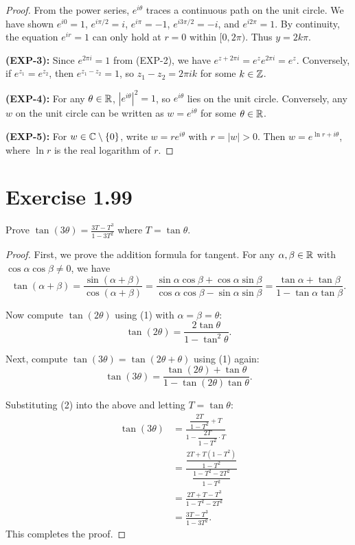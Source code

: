 \documentclass{article}
\begin{document}
\begin{proof}
  From the power series, $e^{i\theta}$ traces a continuous path on the
  unit circle. We have shown $e^{i0} = 1$, $e^{i\pi/2} = i$, $e^{i\pi} = -1$,
  $e^{i3\pi/2} = -i$, and $e^{i2\pi} = 1$. By continuity, the equation
  $e^{ir} = 1$ can only hold at $r = 0$ within $[0, 2\pi)$. Thus $y = 2k\pi$.

  \textbf{(EXP-3):} Since $e^{2\pi i} = 1$ from (EXP-2), we have
  $e^{z + 2\pi i} = e^z e^{2\pi i} = e^z$. Conversely, if $e^{z_1} = e^{z_2}$,
  then $e^{z_1 - z_2} = 1$, so $z_1 - z_2 = 2\pi i k$ for some $k \in \mathbb{Z}$.

  \textbf{(EXP-4):} For any $\theta \in \mathbb{R}$, $|e^{i\theta}|^2 = 1$, so
  $e^{i\theta}$ lies on the unit circle. Conversely, any $w$ on the unit
  circle can be written as $w = e^{i\theta}$ for some $\theta \in \mathbb{R}$.

  \textbf{(EXP-5):} For $w \in \mathbb{C} \setminus \{0\}$, write $w = re^{i\theta}$
  with $r = |w| > 0$. Then $w = e^{\ln r + i\theta}$, where $\ln r$ is
  the real logarithm of $r$.
\end{proof}

\section{Exercise 1.99}
Prove $\tan(3\theta) = \frac{3T - T^3}{1 - 3T^2}$ where $T = \tan \theta$.

\begin{proof}
  First, we prove the addition formula for tangent. For any
  $\alpha, \beta \in \mathbb{R}$ with $\cos\alpha\cos\beta \neq 0$, we have
  \[
    \tan(\alpha + \beta)
    = \frac{\sin(\alpha + \beta)}{\cos(\alpha + \beta)}
    = \frac{\sin\alpha\cos\beta + \cos\alpha\sin\beta}
    {\cos\alpha\cos\beta - \sin\alpha\sin\beta}
    = \frac{\tan\alpha + \tan\beta}{1 - \tan\alpha\tan\beta}.
    \tag{1}
  \]

  Now compute $\tan(2\theta)$ using (1) with $\alpha = \beta = \theta$:
  \[
    \tan(2\theta) = \frac{2\tan\theta}{1 - \tan^2\theta}.
    \tag{2}
  \]

  Next, compute $\tan(3\theta) = \tan(2\theta + \theta)$ using (1) again:
  \[
    \tan(3\theta)
    = \frac{\tan(2\theta) + \tan\theta}{1 - \tan(2\theta)\tan\theta}.
  \]

  Substituting (2) into the above and letting $T = \tan\theta$:
  \[
    \begin{aligned}
      \tan(3\theta)
      &= \frac{\dfrac{2T}{1 - T^2} + T}{1 - \dfrac{2T}{1 - T^2} \cdot T} \\
      &= \frac{\dfrac{2T + T(1 - T^2)}{1 - T^2}}
      {\dfrac{1 - T^2 - 2T^2}{1 - T^2}} \\
      &= \frac{2T + T - T^3}{1 - T^2 - 2T^2} \\
      &= \frac{3T - T^3}{1 - 3T^2}.
    \end{aligned}
  \]
  This completes the proof.
\end{proof}
\end{document}
